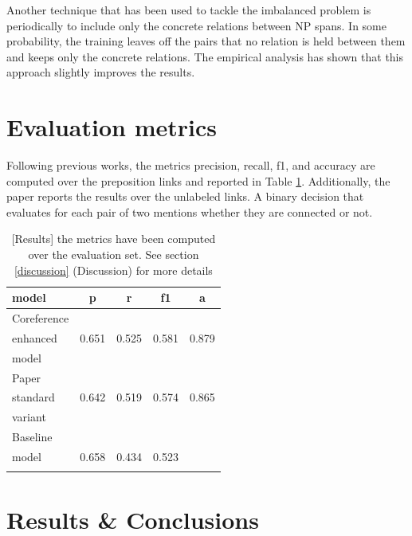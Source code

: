 \documentclass[11pt, a4paper, twocolumn]{article}
\begin{document}
Another technique that has been used to tackle the imbalanced problem is periodically to include only the concrete relations between NP spans. In some probability, the training leaves off the pairs that no relation is held between them and keeps only the concrete relations. The empirical analysis has shown that this approach slightly improves the results.

\section{Evaluation metrics}

Following previous works, the metrics precision, recall, f1, and accuracy are computed over the preposition links and reported in Table \ref{tab:01}.
Additionally, the paper reports the results over the unlabeled links. A binary decision that evaluates for each pair of two mentions whether they are connected or not.

\begin{table}[t]
\caption{[Results] the metrics have been computed over the evaluation set. See section \ref{discussion} (Discussion) for more details}
\begin{tabular}{l c c c c}
\hline
model & p & r & f1 & a  \\
\hline
Coreference \\
enhanced & 0.651 & 0.525 & 0.581 & 0.879\\
model\\
Paper \\
standard & 0.642 & 0.519 & 0.574 & 0.865 \\
variant\\
Baseline\\
model  & 0.658 & 0.434 & 0.523 \\
\cite{tne}\\
\hline
\end{tabular}
\label{tab:01}
\end{table}

\section{Results \& Conclusions}
\label{conclusions}
\end{document}

